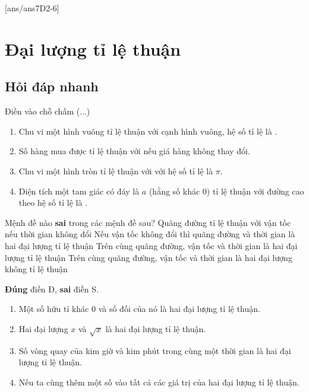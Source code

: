 [ans/ans7D2-6]

\section{Đại lượng tỉ lệ thuận}
\subsection{Hỏi đáp nhanh}
\begin{ex}%
	Điền vào chỗ chấm (...)
	\begin{enumerate}
		\item Chu vi một hình vuông tỉ lệ thuận với cạnh hình vuông, hệ số tỉ lệ là .
		\item Số hàng mua được tỉ lệ thuận với  nếu giá hàng không thay đổi.
		\item Chu vi một hình tròn tỉ lệ thuận với  với hệ số tỉ lệ là $\pi$.
		\item Diện tích một tam giác có đáy là $a$ (hằng số khác $0$) tỉ lệ thuận với đường cao theo hệ số tỉ lệ là .
	\end{enumerate}
\end{ex}

\begin{ex}%
	Mệnh đề nào \textbf{sai} trong các mệnh đề sau?
	\choice
	{Quãng đường tỉ lệ thuận với vận tốc nếu thời gian không đổi}
	{Nếu vận tốc không đổi thì quãng đường và thời gian là hai đại lượng tỉ lệ thuận}
	{\True Trên cùng quãng đường, vận tốc và thời gian là hai đại lượng tỉ lệ thuận}
	{Trên cùng quãng đường, vận tốc và thời gian là hai đại lượng không tỉ lệ thuận}
\end{ex}

\begin{ex}%
	\textbf{Đúng} điền Đ, \textbf{sai} điền S.
	\begin{enumerate}
		\item {} Một số hữu tỉ khác  $0$ và số đối của nó là hai đại lượng tỉ lệ thuận.
		\item {} Hai đại lượng $x$ và $\sqrt{x}$ là hai đại lượng tỉ lệ thuận.
		\item {} Số vòng quay của kim giờ và kim phút trong cùng một thời gian là hai đại lượng tỉ lệ thuận.
		\item {} Nếu ta cùng thêm  một số vào tất cả các giá trị của hai đại lượng tỉ lệ thuận.
	\end{enumerate}
\end{ex}

